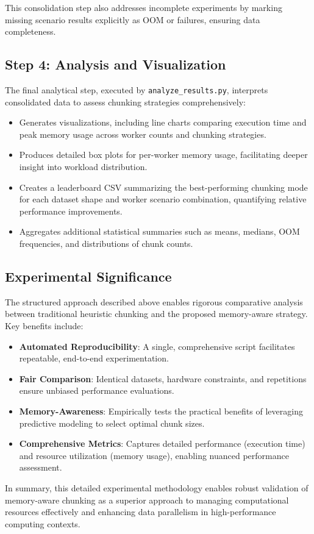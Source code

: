 This consolidation step also addresses incomplete experiments by marking missing scenario results explicitly as \ac{OOM} or failures, ensuring data completeness.

\subsection*{Step 4: Analysis and Visualization}

The final analytical step, executed by \texttt{analyze\_results.py}, interprets consolidated data to assess chunking strategies comprehensively:

\begin{itemize}
    \item Generates visualizations, including line charts comparing execution time and peak memory usage across worker counts and chunking strategies.
    \item Produces detailed box plots for per-worker memory usage, facilitating deeper insight into workload distribution.
    \item Creates a leaderboard \ac{CSV} summarizing the best-performing chunking mode for each dataset shape and worker scenario combination, quantifying relative performance improvements.
    \item Aggregates additional statistical summaries such as means, medians, \ac{OOM} frequencies, and distributions of chunk counts.
\end{itemize}

\subsection*{Experimental Significance}

The structured approach described above enables rigorous comparative analysis between traditional heuristic chunking and the proposed memory-aware strategy.
Key benefits include:

\begin{itemize}
    \item \textbf{Automated Reproducibility}: A single, comprehensive script facilitates repeatable, end-to-end experimentation.
    \item \textbf{Fair Comparison}: Identical datasets, hardware constraints, and repetitions ensure unbiased performance evaluations.
    \item \textbf{Memory-Awareness}: Empirically tests the practical benefits of leveraging predictive modeling to select optimal chunk sizes.
    \item \textbf{Comprehensive Metrics}: Captures detailed performance (execution time) and resource utilization (memory usage), enabling nuanced performance assessment.
\end{itemize}

In summary, this detailed experimental methodology enables robust validation of memory-aware chunking as a superior approach to managing computational resources effectively and enhancing data parallelism in high-performance computing contexts.